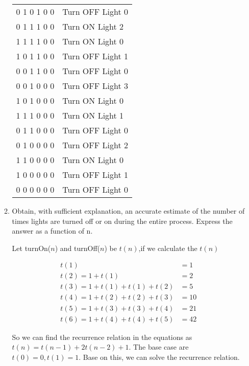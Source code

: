 \documentclass[12pt, a4paper, twoside]{article}
\begin{document}
\begin{enumerate}
\begin{enumerate}[leftmargin=0cm,itemindent=.5cm,labelwidth=\itemindent,labelsep=.2cm,align=left]
\begin{tabular}{rl}
    0 1 0 1 0 0& 	 Turn OFF Light 0\\
    0 1 1 1 0 0& 	 Turn ON Light 2\\
    1 1 1 1 0 0& 	 Turn ON Light 0\\
    1 0 1 1 0 0& 	 Turn OFF Light 1\\
    0 0 1 1 0 0& 	 Turn OFF Light 0\\
    0 0 1 0 0 0& 	 Turn OFF Light 3\\
    1 0 1 0 0 0& 	 Turn ON Light 0\\
    1 1 1 0 0 0& 	 Turn ON Light 1\\
    0 1 1 0 0 0& 	 Turn OFF Light 0\\
    0 1 0 0 0 0& 	 Turn OFF Light 2\\
    1 1 0 0 0 0& 	 Turn ON Light 0\\
    1 0 0 0 0 0& 	 Turn OFF Light 1\\
    0 0 0 0 0 0& 	 Turn OFF Light 0
  \end{tabular}

  \item Obtain, with sufficient explanation, an accurate estimate of the number of times lights are turned off or on during the entire process. Express the answer as a function of n.

  Let turnOn($n$) and turnOff($n$) be $t(n)$,if we calculate the $t(n)$

  \begin{align*}
      t(1)&=1\\
      t(2)=1+t(1)&=2\\
      t(3)=1+t(1)+t(1)+t(2)&=5\\
      t(4)=1+t(2)+t(2)+t(3)&=10\\
      t(5)=1+t(3)+t(3)+t(4)&=21\\
      t(6)=1+t(4)+t(4)+t(5)&=42
  \end{align*}

  So we can find the recurrence relation in the equations as $t(n) = t(n-1)+2t(n-2)+1$. The base case are $t(0)=0, t(1)=1$. Base on this, we can solve the recurrence relation.


\end{enumerate}
\end{enumerate}
\end{document}
